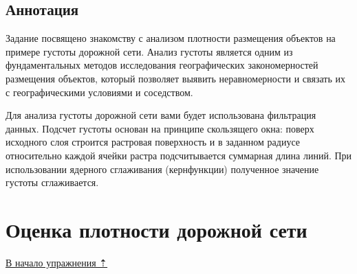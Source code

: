 \documentclass[12pt,]{book}
\begin{document}
\hypertarget{density-analysis-annotation}{%
\subsection{Аннотация}\label{density-analysis-annotation}}

Задание посвящено знакомству с анализом плотности размещения объектов на примере густоты дорожной сети. Анализ густоты является одним из фундаментальных методов исследования географических закономерностей размещения объектов, который позволяет выявить неравномерности и связать их с географическими условиями и соседством.

Для анализа густоты дорожной сети вами будет использована фильтрация данных. Подсчет густоты основан на принципе скользящего окна: поверх исходного слоя строится растровая поверхность и в заданном радиусе относительно каждой ячейки растра подсчитывается суммарная длина линий. При использовании ядерного сглаживания (кернфункции) полученное значение густоты сглаживается.

\hypertarget{density-analysis-estimation}{%
\section{Оценка плотности дорожной сети}\label{density-analysis-estimation}}

\protect\hyperlink{density-analysis}{В начало упражнения ⇡}
\end{document}
